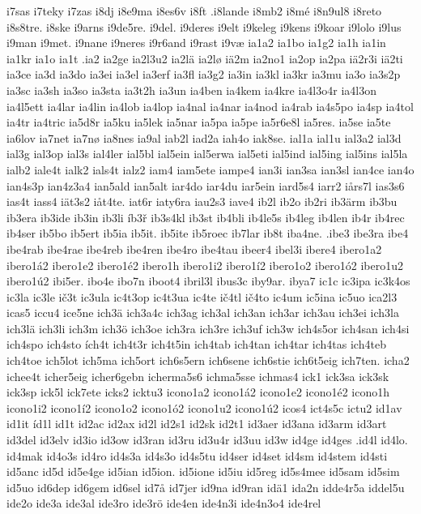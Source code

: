 {{i7sas
i7teky
i7zas
i8dj
i8e9ma
i8es6v
i8ft
.i8lande
i8mb2
i8mé
i8n9ul8
i8reto
i8s8tre.
i8ske
i9arns
i9de5re.
i9del.
i9deres
i9elt
i9keleg
i9kens
i9koar
i9lolo
i9lus
i9man
i9met.
i9nane
i9neres
i9r6and
i9rast
i9væ
ia1a2
ia1bo
ia1g2
ia1h
ia1in
ia1kr
ia1o
ia1t
.ia2
ia2ge
ia2l3u2
ia2lä
ia2lø
iä2m
ia2no1
ia2op
ia2pa
iä2r3i
iä2ti
ia3ce
ia3d
ia3do
ia3ei
ia3el
ia3erf
ia3fl
ia3g2
ia3in
ia3kl
ia3kr
ia3mu
ia3o
ia3s2p
ia3sc
ia3sh
ia3so
ia3sta
ia3t2h
ia3un
ia4ben
ia4kem
ia4kre
ia4l3o4r
ia4l3on
ia4l5ett
ia4lar
ia4lin
ia4lob
ia4lop
ia4nal
ia4nar
ia4nod
ia4rab
ia4s5po
ia4sp
ia4tol
ia4tr
ia4tric
ia5d8r
ia5ku
ia5lek
ia5nar
ia5pa
ia5pe
ia5r6e8l
ia5res.
ia5se
ia5te
ia6lov
ia7net
ia7nø
ia8nes
ia9al
iab2l
iad2a
iah4o
iak8se.
ial1a
ial1u
ial3a2
ial3d
ial3g
ial3op
ial3s
ial4ler
ial5bl
ial5ein
ial5erwa
ial5eti
ial5ind
ial5ing
ial5ins
ial5la
ialb2
iale4t
ialk2
ials4t
ialz2
iam4
iam5ete
iampe4
ian3i
ian3sa
ian3sl
ian4ce
ian4o
ian4s3p
ian4z3a4
ian5ald
ian5alt
iar4do
iar4du
iar5ein
iard5s4
iarr2
iårs7l
ias3s6
ias4t
iass4
iät3s2
iåt4te.
iat6r
iaty6ra
iau2s3
iave4
ib2l
ib2o
ib2ri
ib3ärm
ib3bu
ib3era
ib3ide
ib3in
ib3li
íb3ř
ib3s4kl
ib3st
ib4bli
ib4le5s
ib4leg
ib4len
ib4r
ib4rec
ib4ser
ib5bo
ib5ert
ib5ia
ib5it.
ib5ite
ib5roec
ib7lar
ib8t
iba4ne.
.ibe3
ibe3ra
ibe4
ibe4rab
ibe4rae
ibe4reb
ibe4ren
ibe4ro
ibe4tau
ibeer4
ibel3i
ibere4
ibero1a2
ibero1á2
ibero1e2
ibero1é2
ibero1h
ibero1i2
ibero1í2
ibero1o2
ibero1ó2
ibero1u2
ibero1ú2
ibi5er.
ibo4e
ibo7n
iboot4
ibril3l
ibus3c
iby9ar.
ibya7
ic1c
ic3ipa
ic3k4os
ic3la
ic3le
ič3t
ic3ula
ic4t3op
ic4t3ua
ic4te
ič4tl
ič4to
ic4um
ic5ina
ic5uo
ica2l3
icas5
iccu4
ice5ne
ich3ä
ich3a4c
ich3ag
ich3al
ich3an
ich3ar
ich3au
ich3ei
ich3la
ich3lä
ich3li
ich3m
ich3ö
ich3oe
ich3ra
ich3re
ich3uf
ich3w
ich4s5or
ich4san
ich4si
ich4spo
ich4sto
ích4t
ich4t3r
ich4t5in
ich4tab
ich4tan
ich4tar
ich4tas
ich4teb
ich4toe
ich5lot
ich5ma
ich5ort
ich6s5ern
ich6sene
ich6stie
ich6t5eig
ich7ten.
icha2
ichee4t
icher5eig
icher6gebn
icherma5s6
ichma5sse
ichmas4
ick1
ick3sa
ick3sk
ick3sp
ick5l
ick7ete
icks2
icktu3
icono1a2
icono1á2
icono1e2
icono1é2
icono1h
icono1i2
icono1í2
icono1o2
icono1ó2
icono1u2
icono1ú2
icos4
ict4s5c
ictu2
id1av
id1it
íd1l
id1t
id2ac
id2ax
id2l
id2s1
id2sk
id2t1
id3aer
id3ana
id3arm
id3art
id3del
id3elv
id3io
id3ow
id3ran
id3ru
id3u4r
id3uu
id3w
id4ge
id4ges
.id4l
id4lo.
id4mak
id4o3s
id4ro
id4s3a
id4s3o
id4s5tu
id4ser
id4set
id4sm
id4stem
id4sti
id5anc
id5d
id5e4ge
id5ian
id5ion.
id5ione
id5iu
id5reg
id5s4mee
id5sam
id5sim
id5uo
id6dep
id6gem
id6sel
id7å
id7jer
id9na
id9ran
idä1
ida2n
idde4r5a
iddel5u
ide2o
ide3a
ide3al
ide3ro
ide3rö
ide4en
ide4n3i
ide4n3o4
ide4rel
}}

